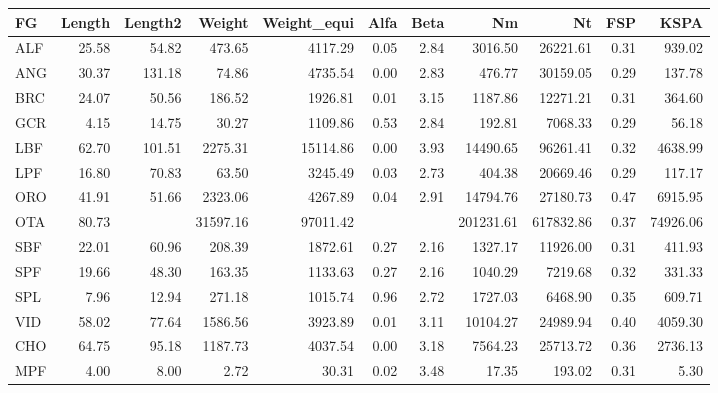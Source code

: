 \documentclass[11pt]{article}
\begin{document}
\begin{itemize}
\begin{itemize}
\begin{table}[htb]
\begin{center}
\begin{tabular}{lrrrrrrrrrr}
 FG   &  Length  &  Length2  &    Weight  &  Weight_equi  &  Alfa  &  Beta  &         Nm  &         Nt  &   FSP  &      KSPA  \\
\hline
 ALF  &   25.58  &    54.82  &    473.65  &      4117.29  &  0.05  &  2.84  &    3016.50  &   26221.61  &  0.31  &    939.02  \\
 ANG  &   30.37  &   131.18  &     74.86  &      4735.54  &  0.00  &  2.83  &     476.77  &   30159.05  &  0.29  &    137.78  \\
 BRC  &   24.07  &    50.56  &    186.52  &      1926.81  &  0.01  &  3.15  &    1187.86  &   12271.21  &  0.31  &    364.60  \\
 GCR  &    4.15  &    14.75  &     30.27  &      1109.86  &  0.53  &  2.84  &     192.81  &    7068.33  &  0.29  &     56.18  \\
 LBF  &   62.70  &   101.51  &   2275.31  &     15114.86  &  0.00  &  3.93  &   14490.65  &   96261.41  &  0.32  &   4638.99  \\
 LPF  &   16.80  &    70.83  &     63.50  &      3245.49  &  0.03  &  2.73  &     404.38  &   20669.46  &  0.29  &    117.17  \\
 ORO  &   41.91  &    51.66  &   2323.06  &      4267.89  &  0.04  &  2.91  &   14794.76  &   27180.73  &  0.47  &   6915.95  \\
 OTA  &   80.73  &           &  31597.16  &     97011.42  &        &        &  201231.61  &  617832.86  &  0.37  &  74926.06  \\
 SBF  &   22.01  &    60.96  &    208.39  &      1872.61  &  0.27  &  2.16  &    1327.17  &   11926.00  &  0.31  &    411.93  \\
 SPF  &   19.66  &    48.30  &    163.35  &      1133.63  &  0.27  &  2.16  &    1040.29  &    7219.68  &  0.32  &    331.33  \\
 SPL  &    7.96  &    12.94  &    271.18  &      1015.74  &  0.96  &  2.72  &    1727.03  &    6468.90  &  0.35  &    609.71  \\
 VID  &   58.02  &    77.64  &   1586.56  &      3923.89  &  0.01  &  3.11  &   10104.27  &   24989.94  &  0.40  &   4059.30  \\
 CHO  &   64.75  &    95.18  &   1187.73  &      4037.54  &  0.00  &  3.18  &    7564.23  &   25713.72  &  0.36  &   2736.13  \\
 MPF  &    4.00  &     8.00  &      2.72  &        30.31  &  0.02  &  3.48  &      17.35  &     193.02  &  0.31  &      5.30  \\
\end{tabular}
\end{center}
\end{table}

\end{itemize}
\end{itemize} %
\end{document}
